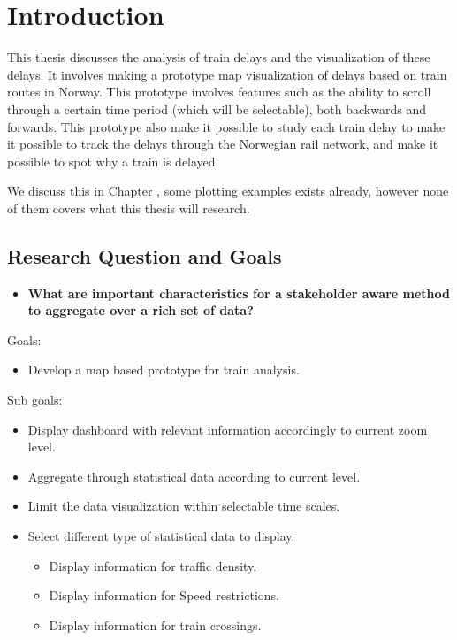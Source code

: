 
\chapter{Introduction}
\label{chapter:introduction}

This thesis discusses the  analysis of train delays and the visualization of 
these delays. It involves making a prototype map visualization of delays 
based on train routes in Norway. This prototype involves features such as 
the ability to scroll through a certain time period (which will be selectable), 
both backwards and forwards. This prototype also make it possible to study each train 
delay to make it possible to track the delays through the Norwegian rail 
network, and make it possible to spot why a train is delayed.

We discuss this in Chapter , some plotting 
examples exists already, however none of them covers what this thesis will 
research.

\section{Research Question and Goals} %
\label{sec:intro_research_question}
\begin{itemize}
	\item \textbf{What are important characteristics for a stakeholder aware method to 
	aggregate over a rich set of data?}
\end{itemize}

Goals:

\begin{itemize}
	\item Develop a map based prototype for train analysis.
\end{itemize}

Sub goals:

\begin{itemize}
	\item Display dashboard with relevant information accordingly to current zoom level.
	\item Aggregate through statistical data according to current level.
	\item Limit the data visualization within selectable time scales.
	\item Select different type of statistical data to display.
	\begin{itemize}
		\item Display information for traffic density.
		\item Display information for Speed restrictions.
		\item Display information for train crossings.
	\end{itemize}
\end{itemize}

